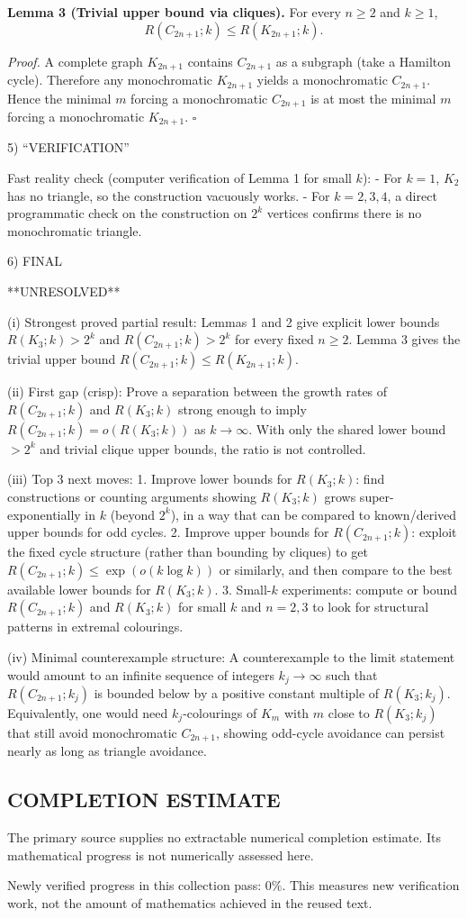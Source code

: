 \textbf{Lemma 3 (Trivial upper bound via cliques).}
For every $n\ge 2$ and $k\ge 1$,
\[
R(C_{2n+1};k) \le R(K_{2n+1};k).
\]

\emph{Proof.}
A complete graph $K_{2n+1}$ contains $C_{2n+1}$ as a subgraph (take a Hamilton cycle). Therefore any monochromatic $K_{2n+1}$ yields a monochromatic $C_{2n+1}$. Hence the minimal $m$ forcing a monochromatic $C_{2n+1}$ is at most the minimal $m$ forcing a monochromatic $K_{2n+1}$. $\square$

5) “VERIFICATION”

Fast reality check (computer verification of Lemma 1 for small $k$):
- For $k=1$, $K_{2}$ has no triangle, so the construction vacuously works.
- For $k=2,3,4$, a direct programmatic check on the construction on $2^k$ vertices confirms there is no monochromatic triangle.

6) FINAL

**UNRESOLVED**

(i) Strongest proved partial result: Lemmas 1 and 2 give explicit lower bounds $R(K_3;k)>2^k$ and $R(C_{2n+1};k)>2^k$ for every fixed $n\ge 2$. Lemma 3 gives the trivial upper bound $R(C_{2n+1};k)\le R(K_{2n+1};k)$.

(ii) First gap (crisp): Prove a separation between the growth rates of $R(C_{2n+1};k)$ and $R(K_3;k)$ strong enough to imply $R(C_{2n+1};k)=o(R(K_3;k))$ as $k\to\infty$. With only the shared lower bound $>2^k$ and trivial clique upper bounds, the ratio is not controlled.

(iii) Top 3 next moves:
1. Improve lower bounds for $R(K_3;k)$: find constructions or counting arguments showing $R(K_3;k)$ grows super-exponentially in $k$ (beyond $2^k$), in a way that can be compared to known/derived upper bounds for odd cycles.
2. Improve upper bounds for $R(C_{2n+1};k)$: exploit the fixed cycle structure (rather than bounding by cliques) to get $R(C_{2n+1};k)\le \exp(o(k\log k))$ or similarly, and then compare to the best available lower bounds for $R(K_3;k)$.
3. Small-$k$ experiments: compute or bound $R(C_{2n+1};k)$ and $R(K_3;k)$ for small $k$ and $n=2,3$ to look for structural patterns in extremal colourings.

(iv) Minimal counterexample structure: A counterexample to the limit statement would amount to an infinite sequence of integers $k_j\to\infty$ such that $R(C_{2n+1};k_j)$ is bounded below by a positive constant multiple of $R(K_3;k_j)$. Equivalently, one would need $k_j$-colourings of $K_{m}$ with $m$ close to $R(K_3;k_j)$ that still avoid monochromatic $C_{2n+1}$, showing odd-cycle avoidance can persist nearly as long as triangle avoidance.



\subsection*{COMPLETION ESTIMATE}
The primary source supplies no extractable numerical completion estimate. Its mathematical progress is not numerically assessed here.

Newly verified progress in this collection pass: $0\%$. This measures new verification work, not the amount of mathematics achieved in the reused text.
